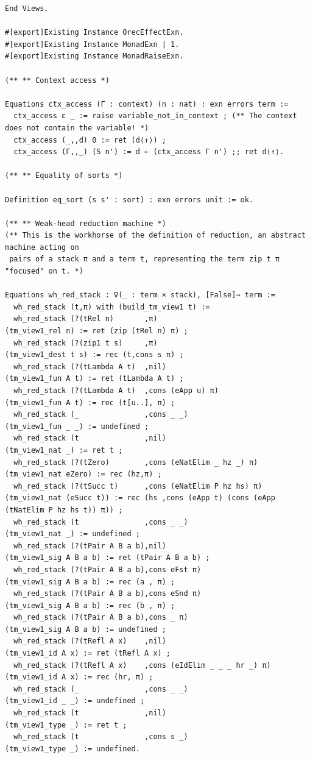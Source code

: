 \begin{lstlisting}
End Views.

#[export]Existing Instance OrecEffectExn.
#[export]Existing Instance MonadExn | 1.
#[export]Existing Instance MonadRaiseExn.

(** ** Context access *)

Equations ctx_access (Γ : context) (n : nat) : exn errors term :=
  ctx_access ε _ := raise variable_not_in_context ; (** The context does not contain the variable! *)
  ctx_access (_,,d) 0 := ret (d⟨↑⟩) ;
  ctx_access (Γ,,_) (S n') := d ← (ctx_access Γ n') ;; ret d⟨↑⟩.

(** ** Equality of sorts *)

Definition eq_sort (s s' : sort) : exn errors unit := ok.

(** ** Weak-head reduction machine *)
(** This is the workhorse of the definition of reduction, an abstract machine acting on
 pairs of a stack π and a term t, representing the term zip t π "focused" on t. *)

Equations wh_red_stack : ∇(_ : term × stack), [False]⇒ term :=
  wh_red_stack (t,π) with (build_tm_view1 t) :=
  wh_red_stack (?(tRel n)       ,π)                           (tm_view1_rel n) := ret (zip (tRel n) π) ;
  wh_red_stack (?(zip1 t s)     ,π)                           (tm_view1_dest t s) := rec (t,cons s π) ;
  wh_red_stack (?(tLambda A t)  ,nil)                         (tm_view1_fun A t) := ret (tLambda A t) ;
  wh_red_stack (?(tLambda A t)  ,cons (eApp u) π)             (tm_view1_fun A t) := rec (t[u..], π) ;
  wh_red_stack (_               ,cons _ _)                    (tm_view1_fun _ _) := undefined ;
  wh_red_stack (t               ,nil)                         (tm_view1_nat _) := ret t ;
  wh_red_stack (?(tZero)        ,cons (eNatElim _ hz _) π)    (tm_view1_nat eZero) := rec (hz,π) ;
  wh_red_stack (?(tSucc t)      ,cons (eNatElim P hz hs) π)   (tm_view1_nat (eSucc t)) := rec (hs ,cons (eApp t) (cons (eApp (tNatElim P hz hs t)) π)) ;
  wh_red_stack (t               ,cons _ _)                    (tm_view1_nat _) := undefined ;
  wh_red_stack (?(tPair A B a b),nil)                         (tm_view1_sig A B a b) := ret (tPair A B a b) ;
  wh_red_stack (?(tPair A B a b),cons eFst π)                 (tm_view1_sig A B a b) := rec (a , π) ;
  wh_red_stack (?(tPair A B a b),cons eSnd π)                 (tm_view1_sig A B a b) := rec (b , π) ;
  wh_red_stack (?(tPair A B a b),cons _ π)                    (tm_view1_sig A B a b) := undefined ;
  wh_red_stack (?(tRefl A x)    ,nil)                         (tm_view1_id A x) := ret (tRefl A x) ;
  wh_red_stack (?(tRefl A x)    ,cons (eIdElim _ _ _ hr _) π) (tm_view1_id A x) := rec (hr, π) ;
  wh_red_stack (_               ,cons _ _)                    (tm_view1_id _ _) := undefined ;
  wh_red_stack (t               ,nil)                         (tm_view1_type _) := ret t ;
  wh_red_stack (t               ,cons s _)                    (tm_view1_type _) := undefined.



\end{lstlisting}
